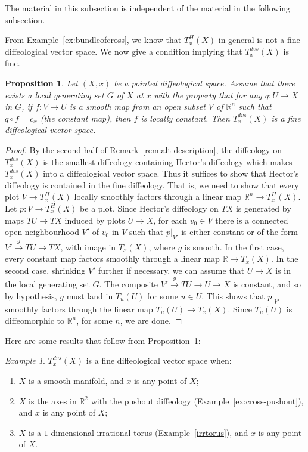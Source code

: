 \documentclass{amsart}
\newtheorem{prop}[de]{Proposition}
\theoremstyle{remark}
\newtheorem{ex}[de]{Example}
\newcommand{\ra}{\to}
\newcommand{\lra}{\longrightarrow}
\newcommand{\llra}[1]{\stackrel{#1}{\lra}}  %
\def \R{\mathbb{R}}
\begin{document}
The material in this subsection is independent of the material in
the following subsection.

\medskip

From Example~\ref{ex:bundleofcross},
we know that $T^H_x(X)$ in general is not a fine diffeological vector space.
We now give a condition implying that $T^{dvs}_x(X)$ is fine.

\begin{prop}\label{prop:fine}
Let $(X,x)$ be a pointed diffeological space.
Assume that there exists a local generating set $G$ of $X$ at $x$ with the property
that for any $q:U \ra X$ in $G$,
if $f : V \to U$ is a smooth map from an open subset $V$ of $\R^n$ such that
$q \circ f = c_x$ (the constant map), then $f$ is locally constant.
Then $T_x^{dvs}(X)$ is a fine diffeological vector space.
\end{prop}

\begin{proof}
By the second half of Remark~\ref{rem:alt-description}, the
diffeology on $T^{dvs}_x(X)$ is the smallest diffeology containing
Hector's diffeology which makes $T^{dvs}_x(X)$ into a diffeological
vector space.
Thus it suffices to show that Hector's diffeology is contained
in the fine diffeology.
That is, we need to show that every plot $V \ra T^H_x(X)$
locally smoothly factors through a linear map $\R^n \to T^H_x(X)$.
Let $p : V \to T^H_x(X)$ be a plot.
Since Hector's diffeology on $TX$ is generated by maps $TU \to TX$
induced by plots $U \to X$, for each $v_0 \in V$ there is a connected
open neighbourhood $V'$ of $v_0$ in $V$ such that $p|_{V'}$ is either
constant or of the form $V' \llra{g} TU \to TX$, with image in $T_x(X)$,
where $g$ is smooth.
In the first case, every constant map factors smoothly through a
linear map $\R \to T_x(X)$.
In the second case, shrinking $V'$ further if necessary,
we can assume that $U \to X$ is in the local generating set $G$.
The composite $V' \llra{g} TU \to U \to X$ is constant, and so by hypothesis,
$g$ must land in $T_{u}(U)$ for some $u \in U$.
This shows that $p|_{V'}$ smoothly factors through the linear map $T_u(U) \to T_x(X)$.
Since $T_u(U)$ is diffeomorphic to $\R^n$, for some $n$, we are done.
\end{proof}


Here are some results that follow from Proposition~\ref{prop:fine}:

\begin{ex}\label{ex:fineexamples}
$T_x^{dvs}(X)$ is a fine diffeological vector space when:
\begin{enumerate}
\item $X$ is a smooth manifold, and $x$ is any point of $X$;
\item $X$ is the axes in $\R^2$ with the pushout diffeology (Example~\ref{ex:cross-pushout}),
and $x$ is any point of $X$;
\item\label{tangentirrtorus} $X$ is a $1$-dimensional irrational torus (Example~\ref{irrtorus}),
and $x$ is any point of $X$.
\end{enumerate}
\end{ex}
\end{document}
